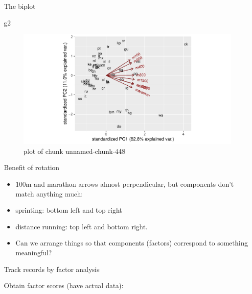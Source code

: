 \documentclass[ignorenonframetext,]{beamer}
\newenvironment{Shaded}{\begin{snugshade}}{\end{snugshade}}
\newcommand{\DataTypeTok}[1]{\textcolor[rgb]{0.13,0.29,0.53}{#1}}
\newcommand{\DecValTok}[1]{\textcolor[rgb]{0.00,0.00,0.81}{#1}}
\newcommand{\KeywordTok}[1]{\textcolor[rgb]{0.13,0.29,0.53}{\textbf{#1}}}
\newcommand{\NormalTok}[1]{#1}
\newcommand{\OperatorTok}[1]{\textcolor[rgb]{0.81,0.36,0.00}{\textbf{#1}}}
\newcommand{\StringTok}[1]{\textcolor[rgb]{0.31,0.60,0.02}{#1}}
\begin{document}
\begin{frame}[fragile]{The biplot}
\protect\hypertarget{the-biplot-2}{}

\begin{Shaded}
\begin{Highlighting}[]
\NormalTok{g2}
\end{Highlighting}
\end{Shaded}

\begin{figure}
\centering
\includegraphics{figure/unnamed-chunk-448-1.pdf}
\caption{plot of chunk unnamed-chunk-448}
\end{figure}

\end{frame}

\begin{frame}{Benefit of rotation}
\protect\hypertarget{benefit-of-rotation}{}

\begin{itemize}
\item
  100m and marathon arrows almost perpendicular, but components don't
  match anything much:
\item
  sprinting: bottom left and top right
\item
  distance running: top left and bottom right.
\item
  Can we arrange things so that components (factors) correspond to
  something meaningful?
\end{itemize}

\end{frame}

\begin{frame}[fragile]{Track records by factor analysis}
\protect\hypertarget{track-records-by-factor-analysis}{}

Obtain factor scores (have actual data):

\normalsize

\begin{Shaded}
\end{Shaded}

\normalsize

\end{frame}
\end{document}
